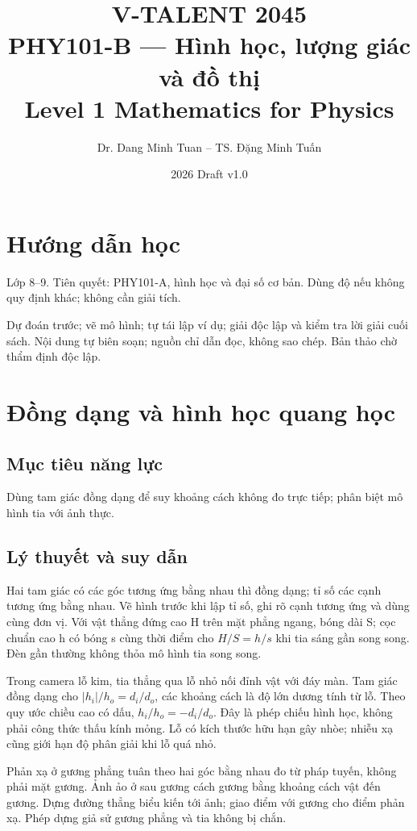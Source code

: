 \documentclass[11pt,a4paper,openany]{book}
\begin{document}
\title{V-TALENT 2045\\ PHY101-B --- Hình học, lượng giác và đồ thị\\\large Level 1 \textbar{} Mathematics for Physics}
\author{Dr. Dang Minh Tuan -- TS. Đặng Minh Tuấn}
\date{2026 \textbar{} Draft v1.0}
\maketitle
\tableofcontents
\chapter*{Hướng dẫn học}
Lớp 8–9. Tiên quyết: PHY101-A, hình học và đại số cơ bản. Dùng độ nếu không quy định khác; không cần giải tích.

Dự đoán trước; vẽ mô hình; tự tái lập ví dụ; giải độc lập và kiểm tra lời giải cuối sách. Nội dung tự biên soạn; nguồn chỉ dẫn đọc, không sao chép. Bản thảo chờ thẩm định độc lập.
\chapter{Đồng dạng và hình học quang học}
\section{Mục tiêu năng lực}
Dùng tam giác đồng dạng để suy khoảng cách không đo trực tiếp; phân biệt mô hình tia với ảnh thực.
\section{Lý thuyết và suy dẫn}
Hai tam giác có các góc tương ứng bằng nhau thì đồng dạng; tỉ số các cạnh tương ứng bằng nhau. Vẽ hình trước khi lập tỉ số, ghi rõ cạnh tương ứng và dùng cùng đơn vị. Với vật thẳng đứng cao H trên mặt phẳng ngang, bóng dài S; cọc chuẩn cao h có bóng s cùng thời điểm cho $H/S=h/s$ khi tia sáng gần song song. Đèn gần thường không thỏa mô hình tia song song.

Trong camera lỗ kim, tia thẳng qua lỗ nhỏ nối đỉnh vật với đáy màn. Tam giác đồng dạng cho $|h_i|/h_o=d_i/d_o$, các khoảng cách là độ lớn dương tính từ lỗ. Theo quy ước chiều cao có dấu, $h_i/h_o=-d_i/d_o$. Đây là phép chiếu hình học, không phải công thức thấu kính mỏng. Lỗ có kích thước hữu hạn gây nhòe; nhiễu xạ cũng giới hạn độ phân giải khi lỗ quá nhỏ.

Phản xạ ở gương phẳng tuân theo hai góc bằng nhau đo từ pháp tuyến, không phải mặt gương. Ảnh ảo ở sau gương cách gương bằng khoảng cách vật đến gương. Dựng đường thẳng biểu kiến tới ảnh; giao điểm với gương cho điểm phản xạ. Phép dựng giả sử gương phẳng và tia không bị chắn.
\begin{center}
\end{center}
\end{document}

